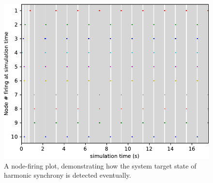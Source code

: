 \begin{figure}[h]
	\centering
	\includegraphics[width=\linewidth]{Assets/Figures/Illustrations/10AgentsPerformanceMeasure.pdf}
	\caption[A performance-measure plot, demonstrating the detection of the system target state of harmonic synchrony]{A node-firing plot, demonstrating how the system target state of harmonic synchrony is detected eventually.}
	\label{fig:node_firing_plot}
\end{figure}